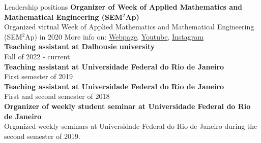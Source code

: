 \documentclass[12pt]{resume} %
\begin{document}
\begin{rSection}{Leadership positions}
{\bf Organizer of Week of Applied Mathematics and Mathematical Engineering (SEM$^2$Ap)}
\\
Organized virtual Week of Applied Mathematics and Mathematical Engineering (SEM$^2$Ap) in 2020
{\scriptsize More info on:  \href{http://semap.rio.br/2020/en/}{Webpage},   \href{https://www.youtube.com/channel/UC14NMQ5cOsSuLrAQGGa2T4Q}{Youtube}, 
\href{https://www.instagram.com/semap.rio/}{Instagram}}
\\
{\bf Teaching assistant at Dalhousie university}
\\
Fall of 2022 - current
\\
{\bf Teaching assistant at Universidade Federal do Rio de Janeiro} 
\\
First semester of 2019
\\
{\bf Teaching assistant at Universidade Federal do Rio de Janeiro} 
\\
First and second semester of 2018
\\
{\bf Organizer of weekly student seminar at Universidade Federal do Rio de Janeiro}
\\
Organized weekly seminars at Universidade Federal do Rio de Janeiro during the second semester of 2019.
\end{rSection}



\end{document}
